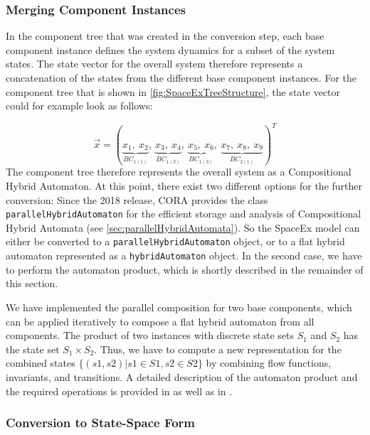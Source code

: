 \subsubsection{Merging Component Instances} \label{sec:mergingComponentInstances}

In the component tree that was created in the conversion step, each base component instance defines the system dynamics for a subset of the system states. The state vector for the overall system therefore represents a concatenation of the states from the different base component instances. For the component tree that is shown in \cref{fig:SpaceExTreeStructure}, the state vector could for example look as follows:

\begin{equation}
 \vec{x} = (\underbrace{x_1,~x_2}_{BC_{1(1)}}, ~ \underbrace{x_3,~x_4}_{BC_{1(2)}}, ~ \underbrace{x_5,~x_6}_{BC_{1(3)}}, ~ \underbrace{x_7,~x_8,~x_9}_{BC_{2(1)}})^T 
\end{equation}
The component tree therefore represents the overall system as a Compositional Hybrid Automaton. At this point, there exist two different options for the further conversion: Since the 2018 release, CORA provides the class \texttt{parallelHybridAutomaton} for the efficient storage and analysis of Compositional Hybrid Automata (see \cref{sec:parallelHybridAutomata}). So the SpaceEx model can either be converted to a \texttt{parallelHybridAutomaton} object, or to a flat hybrid automaton represented as a \texttt{hybridAutomaton} object. In the second case, we have to perform the automaton product, which is shortly described in the remainder of this section.

We have implemented the parallel composition for two base components, which can be applied iteratively to compose a flat hybrid automaton from all components. The product of two instances with discrete state sets $S_1$ and $S_2$ has the state set $S_1 \times S_2$. Thus, we have to compute a new representation for the combined states $\{(s1,s2) | s1 \in S1, s2 \in S2\}$ by combining flow functions, invariants, and transitions. A detailed description of the automaton product and the required operations is provided in \cite[Chapter 5]{Ashford2016} as well as in \cite[Def.~2.9]{Frehse2005}.

\subsubsection{Conversion to State-Space Form} \label{sec:conversionToStateSpaceForm}

